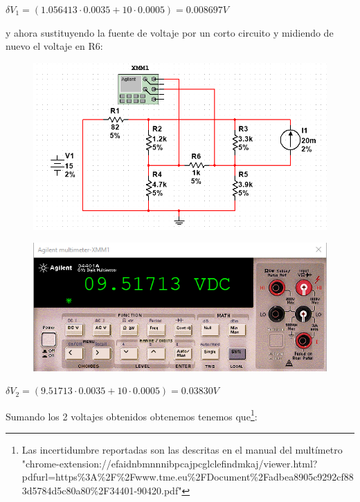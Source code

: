 \documentclass[12pt,a4paper]{article}
\begin{document}
\begin{enumerate}
\begin{figure}[h!]
    \label{fig:my_label}
\end{figure}

$\delta V_1 =(1.056413 \cdot 0.0035 + 10 \cdot 0.0005) = 0.008697 V $

y ahora sustituyendo la fuente de voltaje por un corto circuito y midiendo de nuevo el voltaje en R6:
\newpage

\begin{figure}[h!]
    \centering
    \includegraphics[scale=0.4]{1.b.PNG}

    \label{fig:my_label}
\end{figure}

\begin{figure}[h!]
    \centering
    \includegraphics[scale=0.5]{1.b.multi.PNG}

    \label{fig:my_label}
\end{figure}

$\delta V_2 =(9.51713 \cdot 0.0035 + 10 \cdot 0.0005) = 0.03830 V $

Sumando los 2 voltajes obtenidos obtenemos tenemos que\footnote{Las incertidumbre reportadas son las descritas en el manual del multímetro "chrome-extension://efaidnbmnnnibpcajpcglclefindmkaj/viewer.html?pdfurl=https\%3A\%2F\%2Fwww.tme.eu\%2FDocument\%2Fadbea8905c9292cf883d5784d5c80a80\%2F34401-90420.pdf" }:


\end{enumerate}
\end{document}
